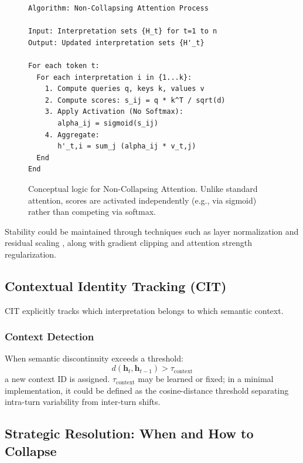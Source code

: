 \documentclass[11pt,a4paper]{article}
\begin{document}
\begin{figure}[ht]
\centering
\begin{verbatim}
Algorithm: Non-Collapsing Attention Process

Input: Interpretation sets {H_t} for t=1 to n
Output: Updated interpretation sets {H'_t}

For each token t:
  For each interpretation i in {1...k}:
    1. Compute queries q, keys k, values v
    2. Compute scores: s_ij = q * k^T / sqrt(d)
    3. Apply Activation (No Softmax):
       alpha_ij = sigmoid(s_ij)
    4. Aggregate:
       h'_t,i = sum_j (alpha_ij * v_t,j)
  End
End
\end{verbatim}
\caption{Conceptual logic for Non-Collapsing Attention.
Unlike standard attention, scores are activated independently (e.g., via sigmoid) rather than competing via softmax.}
\label{fig:attention_logic}
\end{figure}

Stability could be maintained through techniques such as layer normalization \cite{ba2016layer} and residual scaling \cite{bachlechner2020rezero}, along with gradient clipping and attention strength regularization.

\subsection{Contextual Identity Tracking (CIT)}

CIT explicitly tracks which interpretation belongs to which semantic context.

\subsubsection{Context Detection}
When semantic discontinuity exceeds a threshold:
\begin{equation}
d(\mathbf{h}_t, \mathbf{h}_{t-1}) > \tau_{\text{context}}
\end{equation}
a new context ID is assigned.
$\tau_{\text{context}}$ may be learned or fixed; in a minimal implementation, it could be defined as the cosine-distance threshold separating intra-turn variability from inter-turn shifts.

\subsection{Strategic Resolution: When and How to Collapse}
\end{document}
